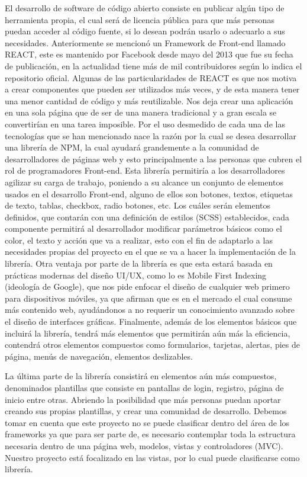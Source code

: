 El desarrollo de software de código abierto consiste en publicar algún tipo de herramienta propia, el cual será de licencia pública para que más personas puedan acceder al código fuente, si lo desean podrán usarlo o adecuarlo a sus necesidades. 
Anteriormente se mencionó un Framework de Front-end llamado REACT, este es mantenido por Facebook desde mayo del 2013 que fue su fecha de publicación, en la actualidad tiene más de mil contribuidores según lo indica el repositorio oficial. 
Algunas de las particularidades de REACT es que nos motiva a crear componentes que pueden ser utilizados más veces, y de esta manera tener una menor cantidad de código y más reutilizable. 
Nos deja crear una aplicación en una sola página que de ser de una manera tradicional y a gran escala se convertirían en una tarea imposible.
\newline
Por el uso desmedido de cada una de las tecnologías que se han mencionado nace la razón por la cual se desea desarrollar una librería de NPM, la cual ayudará grandemente a la comunidad de desarrolladores de páginas web y esto principalmente a las personas que cubren el rol de programadores Front-end. 
Esta librería permitiría a los desarrolladores agilizar su carga de trabajo, poniendo a su alcance un conjunto de elementos usados en el desarrollo Front-end, alguno de ellos son botones, textos, etiquetas de texto, tablas, checkbox, radio botones, etc.  Los cuáles serán elementos definidos, que contarán con una definición de estilos (SCSS) establecidos, cada componente permitirá al desarrollador modificar parámetros básicos como el color, el texto y acción que va a realizar, esto con el fin de adaptarlo a las necesidades propias del proyecto en el que se va a hacer la implementación de la librería.  
Otra ventaja por parte de la librería es que esta estará basada en prácticas modernas del diseño UI/UX, como lo es Mobile First Indexing (ideología de Google), que nos pide enfocar el diseño de cualquier web primero para dispositivos móviles, ya que afirman que es en el mercado el cual consume más contenido web, ayudándonos a no requerir un conocimiento avanzado sobre el diseño de interfaces gráficas. 
Finalmente, además de los elementos básicos que incluirá la librería, tendrá más elementos que permitirán aún más la eficiencia, contendrá otros elementos compuestos como formularios, tarjetas, alertas, pies de página, menús de navegación, elementos deslizables. 

La última parte de la librería consistirá en elementos aún más compuestos, denominados plantillas que consiste en pantallas de login, registro, página de inicio entre otras. Abriendo la posibilidad que más personas puedan aportar creando sus propias plantillas, y crear una comunidad de desarrollo.  
Debemos tomar en cuenta que este proyecto no se puede clasificar dentro del área de los frameworks ya que para ser parte de, es necesario contemplar toda la estructura necesaria dentro de una página web, modelos, vistas y controladores (MVC). Nuestro proyecto está focalizado en las vistas, por lo cual puede clasificarse como librería.  
  
